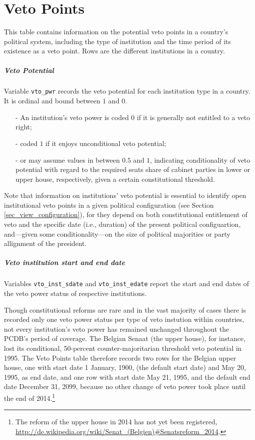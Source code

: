 \section{Veto Points}\label{sec_veto_points}
This table contains information on the potential veto points in a country’s political system, including the type of institution and the time period of its existence as a veto point. Rows are the different institutions in a country.

\subparagraph{Veto Potential}
Variable \texttt{\footnotesize vto\_pwr} records the veto potential for each institution type in a country. It is  ordinal and bound between $1$ and $0$. 
\begin{itemize}\itemsep-4pt 
\item[-] An institution's veto power is coded $0$ if it is generally not entitled to a veto right; 
\item[-] coded $1$ if it enjoys unconditional veto potential; 
\item[-] or may assume values in between $0.5$ and $1$, indicating conditionality of veto potential with regard to the required seats share of cabinet parties in lower or upper house, respectively, given a certain constitutional threshold.
\end{itemize}

Note that information on institutions' veto potential is essential to identify open institutional veto points in a given political configuration (see Section \ref{sec_view_configuration}), for they depend on both constitutional entitlement of veto and the specific date (i.e., duration) of the present political configuartion, and---given some conditionality---on the size of political majorities or party allignment of the president.

\subparagraph{Veto institution start and end date}
Variables \texttt{\footnotesize vto\_inst\_sdate} and \texttt{\footnotesize vto\_inst\_edate} report the start and end dates of the veto power status of respective institutions.

Though constitutional reforms are rare and in the vast majority of cases there is recorded only one veto power status per type of veto instution within countries, not every institution's veto power has remained unchanged throughout the  PCDB's period of coverage. 
The Belgian Senaat (the upper house), for instance, lost its conditional, 50-percent counter-majoritarian threshold veto potential in 1995. 
The Veto Points table therefore records two rows for the Belgian upper house, one with start date 1 January, 1900, (the default start date) and May 20, 1995, as end date, and one row with start date May 21, 1995, and the default end date December 31, 2099, because no other change of veto power took place until the end of 2014.\footnote{The reform of the upper house in 2014 has not yet been registered, \url{http://de.wikipedia.org/wiki/Senat\_(Belgien)\#Senatsreform_2014}.}

